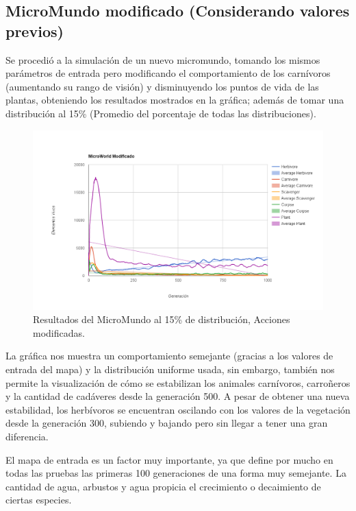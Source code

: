     \subsection{MicroMundo modificado (Considerando valores previos)}
      Se procedió a la simulación de un nuevo micromundo, tomando los mismos parámetros de entrada pero modificando el comportamiento de los carnívoros (aumentando su rango de visión) y disminuyendo los puntos de vida de las plantas, obteniendo los resultados mostrados en la gráfica; además de tomar una distribución al 15\% (Promedio del porcentaje de todas las distribuciones).
      \begin{figure}[h!]
        \centering
          \includegraphics[width=\textwidth]{./images/Modified.png}
          \caption{Resultados del MicroMundo al 15\% de distribución, Acciones modificadas.} 
      \end{figure} 
      \linebreak

      La gráfica nos muestra un comportamiento semejante (gracias a los valores de entrada del mapa) y la distribución uniforme usada, sin embargo, también nos permite la visualización de cómo se estabilizan los animales carnívoros, carroñeros y la cantidad de cadáveres desde la generación 500. A pesar de obtener una nueva estabilidad, los herbívoros se encuentran oscilando con los valores de la vegetación desde la generación 300, subiendo y bajando pero sin llegar a tener una gran diferencia.

      El mapa de entrada es un factor muy importante, ya que define por mucho en todas las pruebas las primeras 100 generaciones de una forma muy semejante. La cantidad de agua, arbustos y agua propicia el crecimiento o decaimiento de ciertas especies.